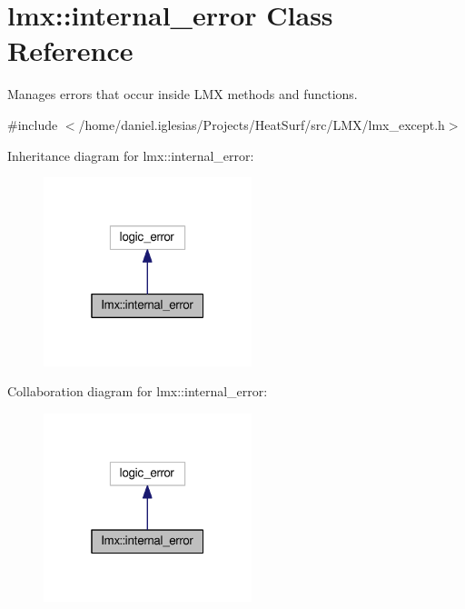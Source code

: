 \hypertarget{classlmx_1_1internal__error}{\section{lmx\-:\-:internal\-\_\-error Class Reference}
\label{classlmx_1_1internal__error}
}


Manages errors that occur inside L\-M\-X methods and functions.  




{\ttfamily \#include $<$/home/daniel.\-iglesias/\-Projects/\-Heat\-Surf/src/\-L\-M\-X/lmx\-\_\-except.\-h$>$}



Inheritance diagram for lmx\-:\-:internal\-\_\-error\-:
\nopagebreak
\begin{figure}[H]
\begin{center}
\leavevmode
\includegraphics[width=172pt]{classlmx_1_1internal__error__inherit__graph}
\end{center}
\end{figure}


Collaboration diagram for lmx\-:\-:internal\-\_\-error\-:
\nopagebreak
\begin{figure}[H]
\begin{center}
\leavevmode
\includegraphics[width=172pt]{classlmx_1_1internal__error__coll__graph}
\end{center}
\end{figure}
